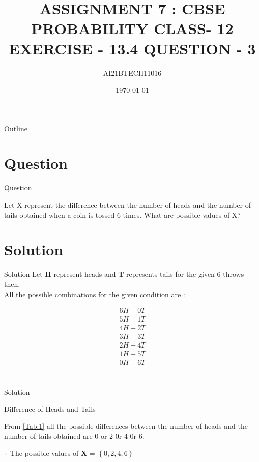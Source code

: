 \documentclass{beamer}
\title{ASSIGNMENT 7 : CBSE PROBABILITY CLASS- 12  EXERCISE - 13.4 QUESTION - 3}
\author{AI21BTECH11016}
\date{\today}
\providecommand{\cbrak}[1]{\ensuremath{\left\{#1\right\}}}
\begin{document}
\begin{frame}
    \titlepage 
\end{frame}

\logo{}

\begin{frame}{Outline}
    \tableofcontents
\end{frame}

\section{Question}
\begin{frame}{Question}
\begin{block}{}
Let X represent the difference between the number of heads and the number of tails obtained when a coin is tossed 6 times. What are possible values of X?
\end{block}
\end{frame}

\section{Solution}
\begin{frame}{Solution}
Let \textbf{H} represent heads and \textbf{T} represents tails for the given 6 throws then,\\
All the possible combinations for the given condition are :
\begin{block}{}
\begin{align}
6 H + 0 T\\
5 H + 1 T\\
4 H + 2 T\\
3 H + 3 T\\
2 H + 4 T\\
1 H + 5 T\\
0 H + 6 T
\end{align}

\end{block}
\end{frame}

\section{}
\begin{frame}{Solution}
\begin{block}{}
     \begin{table}[ht!]
    \centering
    
    \caption{Difference of Heads and Tails}
    \label{Tab:1}
\end{table}   
    \end{block}
\end{frame}

\begin{frame}
From \ref{Tab:1} all the possible differences between the number of heads and the number of tails obtained are 0 or 2 0r 4 0r 6.
\begin{block}{}
\centering
$\therefore$ The possible values of \textbf{X} = \cbrak{0, 2, 4, 6}
\end{block}
\end{frame}
\end{document}
